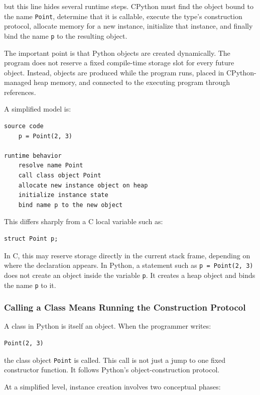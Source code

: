 but this line hides several runtime steps. CPython must find the object bound to the name \texttt{Point}, determine that it is callable, execute the type's construction protocol, allocate memory for a new instance, initialize that instance, and finally bind the name \texttt{p} to the resulting object.

The important point is that Python objects are created dynamically. The program does not reserve a fixed compile-time storage slot for every future object. Instead, objects are produced while the program runs, placed in CPython-managed heap memory, and connected to the executing program through references.

A simplified model is:

\begin{verbatim}
source code
    p = Point(2, 3)

runtime behavior
    resolve name Point
    call class object Point
    allocate new instance object on heap
    initialize instance state
    bind name p to the new object
\end{verbatim}

This differs sharply from a C local variable such as:

\begin{verbatim}
struct Point p;
\end{verbatim}

In C, this may reserve storage directly in the current stack frame, depending on where the declaration appears. In Python, a statement such as \texttt{p = Point(2, 3)} does not create an object inside the variable \texttt{p}. It creates a heap object and binds the name \texttt{p} to it.

\subsubsection*{Calling a Class Means Running the Construction Protocol}

A class in Python is itself an object. When the programmer writes:

\begin{verbatim}
Point(2, 3)
\end{verbatim}

the class object \texttt{Point} is called. This call is not just a jump to one fixed constructor function. It follows Python's object-construction protocol.

At a simplified level, instance creation involves two conceptual phases:

